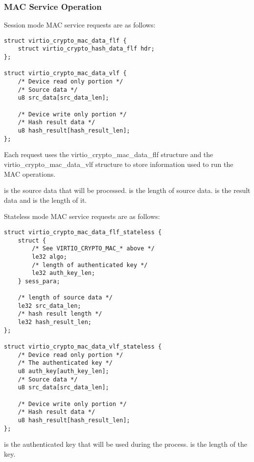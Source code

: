 \subsubsection{MAC Service Operation}\label{sec:Device Types / Crypto Device / Device Operation / MAC Service Operation}

Session mode MAC service requests are as follows:

\begin{lstlisting}
struct virtio_crypto_mac_data_flf {
    struct virtio_crypto_hash_data_flf hdr;
};

struct virtio_crypto_mac_data_vlf {
    /* Device read only portion */
    /* Source data */
    u8 src_data[src_data_len];

    /* Device write only portion */
    /* Hash result data */
    u8 hash_result[hash_result_len];
};
\end{lstlisting}

Each request uses the virtio_crypto_mac_data_flf structure and the
virtio_crypto_mac_data_vlf structure to store information used to run the
MAC operations.

 is the source data that will be processed.
 is the length of source data.
 is the result data and  is the length
of it.

Stateless mode MAC service requests are as follows:

\begin{lstlisting}
struct virtio_crypto_mac_data_flf_stateless {
    struct {
        /* See VIRTIO_CRYPTO_MAC_* above */
        le32 algo;
        /* length of authenticated key */
        le32 auth_key_len;
    } sess_para;

    /* length of source data */
    le32 src_data_len;
    /* hash result length */
    le32 hash_result_len;
};

struct virtio_crypto_mac_data_vlf_stateless {
    /* Device read only portion */
    /* The authenticated key */
    u8 auth_key[auth_key_len];
    /* Source data */
    u8 src_data[src_data_len];

    /* Device write only portion */
    /* Hash result data */
    u8 hash_result[hash_result_len];
};
\end{lstlisting}

 is the authenticated key that will be used during the process.
 is the length of the key.


